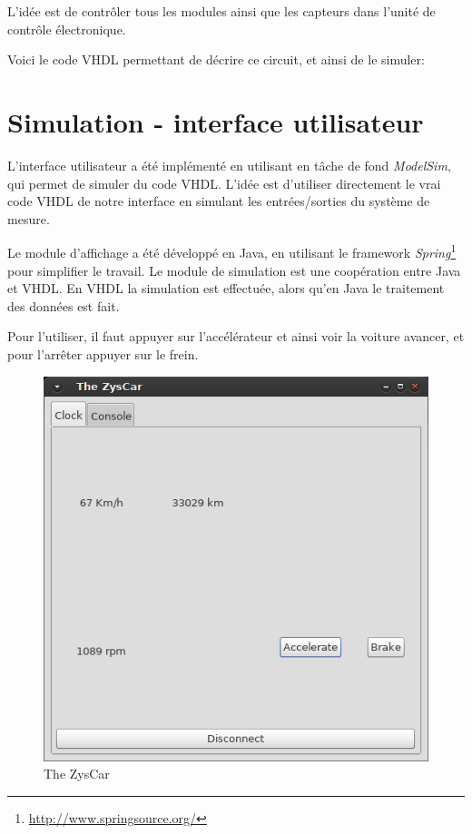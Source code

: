 \documentclass[a4paper,oneside,11pt]{article}  %
\begin{document}
L'idée est de contrôler tous les modules ainsi que les capteurs dans l'unité de contrôle électronique.

Voici le code VHDL permettant de décrire ce circuit, et ainsi de le simuler:



\section{Simulation - interface utilisateur}

L'interface utilisateur a été implémenté en utilisant en tâche de fond \textit{ModelSim}, qui permet de simuler du code VHDL.
L'idée est d'utiliser directement le vrai code VHDL de notre interface en simulant les entrées/sorties du système de mesure.

Le module d'affichage a été développé en Java, en utilisant le framework \textit{Spring}\footnote{\url{http://www.springsource.org/}} pour simplifier le travail.
Le module de simulation est une coopération entre Java et VHDL.
En VHDL la simulation est effectuée, alors qu'en Java le traitement des données est fait.


Pour l'utiliser, il faut appuyer sur l'accélérateur et ainsi voir la voiture avancer, et pour l'arrêter appuyer sur le frein.

\begin{figure}[h!]
	\centering
	\includegraphics[scale=0.6]{ZysCar.png}
	\caption{The ZysCar}
\end{figure}
\end{document}
